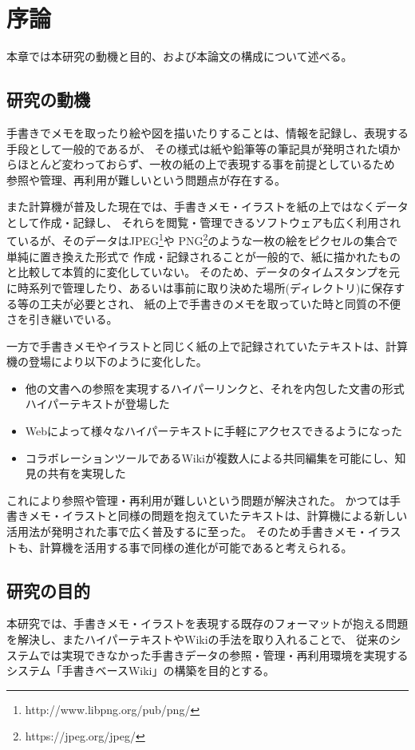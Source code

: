 \chapter{序論}
\label{chap:introduction}

本章では本研究の動機と目的、および本論文の構成について述べる。

\newpage

\section{研究の動機}

手書きでメモを取ったり絵や図を描いたりすることは、情報を記録し、表現する手段として一般的であるが、
その様式は紙や鉛筆等の筆記具が発明された頃からほとんど変わっておらず、一枚の紙の上で表現する事を前提としているため
参照や管理、再利用が難しいという問題点が存在する。

また計算機が普及した現在では、手書きメモ・イラストを紙の上ではなくデータとして作成・記録し、
それらを閲覧・管理できるソフトウェアも広く利用されているが、そのデータはJPEG\footnote{http://www.libpng.org/pub/png/}や
PNG\footnote{https://jpeg.org/jpeg/}のような一枚の絵をピクセルの集合で単純に置き換えた形式で
作成・記録されることが一般的で、紙に描かれたものと比較して本質的に変化していない。
そのため、データのタイムスタンプを元に時系列で管理したり、あるいは事前に取り決めた場所(ディレクトリ)に保存する等の工夫が必要とされ、
紙の上で手書きのメモを取っていた時と同質の不便さを引き継いでいる。

一方で手書きメモやイラストと同じく紙の上で記録されていたテキストは、計算機の登場により以下のように変化した。

\begin{itemize}
    \item 他の文書への参照を実現するハイパーリンクと、それを内包した文書の形式ハイパーテキストが登場した
    \item Webによって様々なハイパーテキストに手軽にアクセスできるようになった
    \item コラボレーションツールであるWikiが複数人による共同編集を可能にし、知見の共有を実現した
\end{itemize}

これにより参照や管理・再利用が難しいという問題が解決された。
かつては手書きメモ・イラストと同様の問題を抱えていたテキストは、計算機による新しい活用法が発明された事で広く普及するに至った。
そのため手書きメモ・イラストも、計算機を活用する事で同様の進化が可能であると考えられる。

\section{研究の目的}
本研究では、手書きメモ・イラストを表現する既存のフォーマットが抱える問題を解決し、またハイパーテキストやWikiの手法を取り入れることで、
従来のシステムでは実現できなかった手書きデータの参照・管理・再利用環境を実現するシステム「手書きベースWiki」の構築を目的とする。

